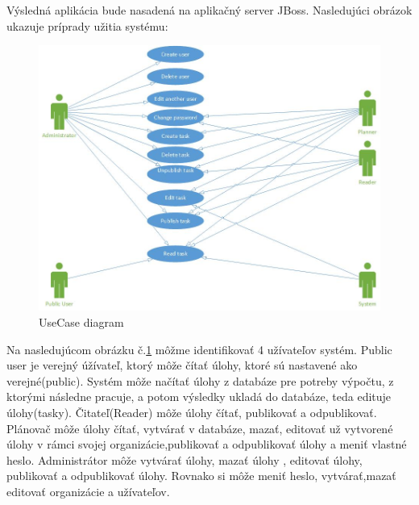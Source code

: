 Výsledná aplikácia bude nasadená na aplikačný server JBoss.
Nasledujúci obrázok ukazuje príprady užitia systému:
\begin{figure}[htb]

\begin{center}

\includegraphics[scale=0.5]{UseCase.jpg} 
\caption{UseCase diagram}
\label{use}

\end{center}

\end{figure}
Na nasledujúcom obrázku č.\ref{use} môžme identifikovať 4 užívateľov systém. Public user je verejný úžívateľ, ktorý môže čítať úlohy, ktoré sú nastavené ako verejné(public). Systém môže načítať úlohy z databáze pre potreby výpočtu, z ktorými následne pracuje, a potom výsledky ukladá do databáze, teda edituje úlohy(tasky). Čitateľ(Reader) môže úlohy čítať, publikovať a odpublikovať. Plánovač môže úlohy čítať, vytvárať v databáze, mazať, editovať už vytvorené úlohy v rámci svojej organizácie,publikovať a odpublikovať úlohy a meniť vlastné heslo. Administrátor môže vytvárať úlohy, mazať úlohy , editovať úlohy, publikovať a odpublikovať úlohy. Rovnako si môže meniť heslo, vytvárať,mazať editovať organizácie a užívateľov.


